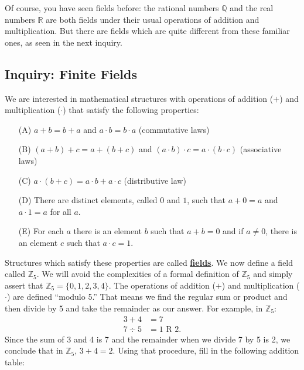 \documentclass[11pt]{article}
\newenvironment{task}
	{\begin{mdframed}[linecolor=lightgray, linewidth=3pt]\raggedright}
	{\end{mdframed}}
\renewcommand\emph[1]{\underline{\bf{#1}}} %
\theoremstyle{definition}
\begin{document}
Of course, you have seen fields before: the rational numbers $\mathbb{Q}$ and the real numbers $\mathbb{R}$ are both fields under their usual operations of
addition and multiplication. But there are fields which are quite different from these familiar ones, as seen in the next inquiry.

\subsection{Inquiry: Finite Fields}
\begin{task}
  We are interested in mathematical structures with operations of addition ($+$) and multiplication ($\cdot$) that satisfy the following properties:
  \begin{itemize}
    \item[(A)] $a+b=b+a$ and $a\cdot b=b\cdot a$ (commutative laws)
    \item[(B)] $(a+b)+c = a + (b+c)$ and $(a\cdot b)\cdot c = a\cdot (b \cdot c)$ (associative laws)
    \item[(C)] $a\cdot (b+c) = a\cdot b + a \cdot c$ (distributive law)
    \item[(D)] There are distinct elements, called $0$ and $1$, such that $a+0 = a $ and $a \cdot 1 = a$ for all $a$.
    \item[(E)] For each $a$ there is an element $b$ such that $a + b = 0$ and if $a\neq 0$, there is an element $c$ such that $a\cdot c = 1$.
  \end{itemize}
  Structures which satisfy these properties are called \emph{fields}. We now define a field called $\mathbb{Z}_5$. We will avoid the complexities of a formal definition of $\mathbb{Z}_5$ and simply assert that 
  $\mathbb{Z}_5 = \{ 0, 1, 2, 3, 4\}$. The operations of addition ($+$) and multiplication ($\cdot$) are defined ``modulo 5.'' That means we find
  the regular sum or product and then divide by 5 and take the remainder as our answer. For example, in $\mathbb{Z}_5$:
  \begin{align*}
    3 + 4 &= 7\\
    7 \div 5 &= 1 \text{ R } 2.
  \end{align*}
  Since the sum of 3 and 4 is 7 and the remainder when we divide 7 by 5 is 2, we conclude that in $\mathbb{Z}_5$, $3 + 4 = 2$. Using that procedure, fill in
  the following addition table:


\end{task}
\end{document}
